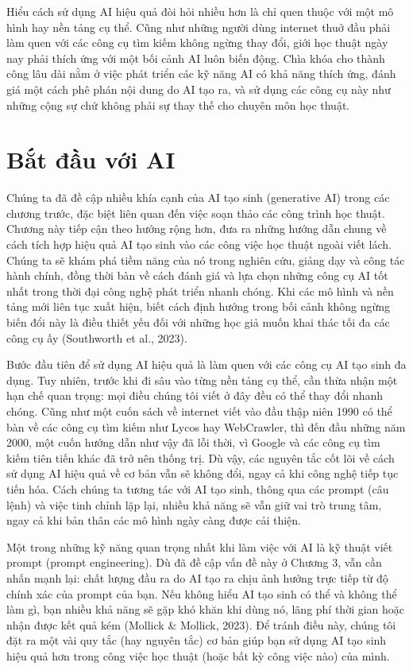 Hiểu cách sử dụng AI hiệu quả đòi hỏi nhiều hơn là chỉ quen thuộc với một mô hình hay nền tảng cụ thể. Cũng như những người dùng internet thuở đầu phải làm quen với các công cụ tìm kiếm không ngừng thay đổi, giới học thuật ngày nay phải thích ứng với một bối cảnh AI luôn biến động. Chìa khóa cho thành công lâu dài nằm ở việc phát triển các kỹ năng AI có khả năng thích ứng, đánh giá một cách phê phán nội dung do AI tạo ra, và sử dụng các công cụ này như những cộng sự chứ không phải sự thay thế cho chuyên môn học thuật.

\section{Bắt đầu với AI}

Chúng ta đã đề cập nhiều khía cạnh của AI tạo sinh (generative AI) trong các chương trước, đặc biệt liên quan đến việc soạn thảo các công trình học thuật. Chương này tiếp cận theo hướng rộng hơn, đưa ra những hướng dẫn chung về cách tích hợp hiệu quả AI tạo sinh vào các công việc học thuật ngoài viết lách. Chúng ta sẽ khám phá tiềm năng của nó trong nghiên cứu, giảng dạy và công tác hành chính, đồng thời bàn về cách đánh giá và lựa chọn những công cụ AI tốt nhất trong thời đại công nghệ phát triển nhanh chóng. Khi các mô hình và nền tảng mới liên tục xuất hiện, biết cách định hướng trong bối cảnh không ngừng biến đổi này là điều thiết yếu đối với những học giả muốn khai thác tối đa các công cụ ấy (Southworth et al., 2023).

Bước đầu tiên để sử dụng AI hiệu quả là làm quen với các công cụ AI tạo sinh đa dụng. Tuy nhiên, trước khi đi sâu vào từng nền tảng cụ thể, cần thừa nhận một hạn chế quan trọng: mọi điều chúng tôi viết ở đây đều có thể thay đổi nhanh chóng. Cũng như một cuốn sách về internet viết vào đầu thập niên 1990 có thể bàn về các công cụ tìm kiếm như Lycos hay WebCrawler, thì đến đầu những năm 2000, một cuốn hướng dẫn như vậy đã lỗi thời, vì Google và các công cụ tìm kiếm tiên tiến khác đã trở nên thống trị. Dù vậy, các nguyên tắc cốt lõi về cách sử dụng AI hiệu quả về cơ bản vẫn sẽ không đổi, ngay cả khi công nghệ tiếp tục tiến hóa. Cách chúng ta tương tác với AI tạo sinh, thông qua các prompt (câu lệnh) và việc tinh chỉnh lặp lại, nhiều khả năng sẽ vẫn giữ vai trò trung tâm, ngay cả khi bản thân các mô hình ngày càng được cải thiện.

Một trong những kỹ năng quan trọng nhất khi làm việc với AI là kỹ thuật viết prompt (prompt engineering). Dù đã đề cập vấn đề này ở Chương 3, vẫn cần nhấn mạnh lại: chất lượng đầu ra do AI tạo ra chịu ảnh hưởng trực tiếp từ độ chính xác của prompt của bạn. Nếu không hiểu AI tạo sinh có thể và không thể làm gì, bạn nhiều khả năng sẽ gặp khó khăn khi dùng nó, lãng phí thời gian hoặc nhận được kết quả kém (Mollick \& Mollick, 2023). Để tránh điều này, chúng tôi đặt ra một vài quy tắc (hay nguyên tắc) cơ bản giúp bạn sử dụng AI tạo sinh hiệu quả hơn trong công việc học thuật (hoặc bất kỳ công việc nào) của mình.

